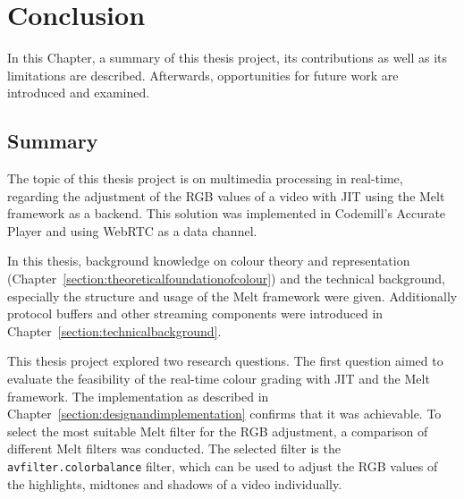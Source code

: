 \documentclass[../MasterThesis.tex]{subfiles}
\begin{document}
	
	
%
%
%
%
%
%
%
%
\newpage
\section{Conclusion} \label{section:conclusion}

In this Chapter, a summary of this thesis project, its contributions as well as its limitations are described. Afterwards, opportunities for future work are introduced and examined.






\subsection{Summary} \label{subsection:summary}


The topic of this thesis project is on multimedia processing in real-time, regarding the adjustment of the RGB values of a video with JIT using the Melt framework as a backend. This solution was implemented in Codemill's Accurate Player and using WebRTC as a data channel.

In this thesis, background knowledge on colour theory and representation (Chapter~\ref{section:theoreticalfoundationofcolour}) and the technical background, especially the structure and usage of the Melt framework were given. Additionally protocol buffers and other streaming components were introduced in Chapter~\ref{section:technicalbackground}.

This thesis project explored two research questions. The first question aimed to evaluate the feasibility of the real-time colour grading with JIT and the Melt framework. The implementation as described in Chapter~\ref{section:designandimplementation} confirms that it was achievable. To select the most suitable Melt filter for the RGB adjustment, a comparison of different Melt filters was conducted. The selected filter is the \texttt{avfilter.colorbalance} filter, which can be used to adjust the RGB values of the highlights, midtones and shadows of a video individually.
\end{document}
